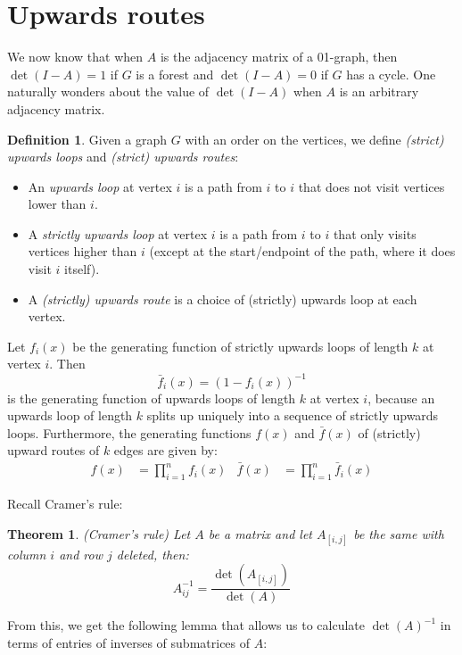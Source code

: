 \documentclass[a4paper, 11pt]{article}
\newtheorem{theorem}{Theorem}[section]
\theoremstyle{definition}
\newtheorem{definition}{Definition}[section]
\begin{document}
\section{Upwards routes}

We now know that when $A$ is the adjacency matrix of a 01-graph, then $\det(I - A) = 1$ if $G$ is a forest and $\det(I - A) = 0$ if $G$ has a cycle. One naturally wonders about the value of $\det(I - A)$ when $A$ is an arbitrary adjacency matrix.

\begin{definition}
  Given a graph $G$ with an order on the vertices, we define \emph{(strict) upwards loops} and \emph{(strict) upwards routes}:
  \begin{itemize}
    \item An \emph{upwards loop} at vertex $i$ is a path from $i$ to $i$ that does not visit vertices lower than $i$.
    \item A \emph{strictly upwards loop} at vertex $i$ is a path from $i$ to $i$ that only visits vertices higher than $i$ (except at the start/endpoint of the path, where it does visit $i$ itself).
    \item A \emph{(strictly) upwards route} is a choice of (strictly) upwards loop at each vertex.
  \end{itemize}
  Let $f_i(x)$ be the generating function of strictly upwards loops of length $k$ at vertex $i$. Then \[ \bar{f}_i(x) = (1 - f_i(x))^{-1} \] is the generating function of upwards loops of length $k$ at vertex $i$, because an upwards loop of length $k$ splits up uniquely into a sequence of strictly upwards loops. Furthermore, the generating functions $f(x)$ and $\bar{f}(x)$ of (strictly) upward routes of $k$ edges are given by:
  \begin{align*}
    f(x) &= \prod_{i=1}^n f_i(x) &
    \bar{f}(x) &= \prod_{i=1}^n \bar{f}_i(x)
  \end{align*}
\end{definition}

Recall Cramer's rule:
\begin{theorem} (Cramer's rule)
  Let $A$ be a matrix and let $A_{[i,j]}$ be the same with column $i$ and row $j$ deleted, then:
  \[ A^{-1}_{ij} = \frac{\det(A_{[i,j]})}{\det(A)} \]
\end{theorem}

From this, we get the following lemma that allows us to calculate $\det(A)^{-1}$ in terms of entries of inverses of submatrices of $A$:
\end{document}
